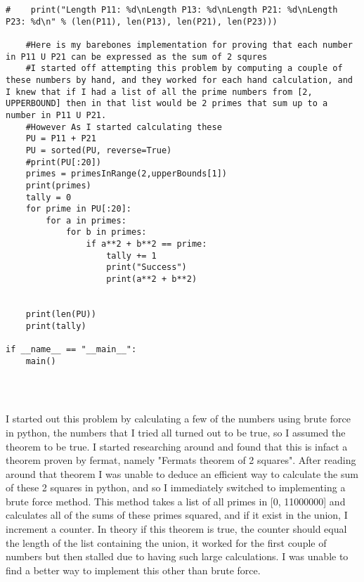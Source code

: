 \documentclass[12pt]{article}
\begin{document}
\begin{enumerate}
\begin{lstlisting}
#    print("Length P11: %d\nLength P13: %d\nLength P21: %d\nLength P23: %d\n" % (len(P11), len(P13), len(P21), len(P23)))
    
    #Here is my barebones implementation for proving that each number in P11 U P21 can be expressed as the sum of 2 squres
    #I started off attempting this problem by computing a couple of these numbers by hand, and they worked for each hand calculation, and I knew that if I had a list of all the prime numbers from [2, UPPERBOUND] then in that list would be 2 primes that sum up to a number in P11 U P21.  
    #However As I started calculating these
    PU = P11 + P21    
    PU = sorted(PU, reverse=True)
    #print(PU[:20])
    primes = primesInRange(2,upperBounds[1])
    print(primes)
    tally = 0
    for prime in PU[:20]:
        for a in primes:
            for b in primes:
                if a**2 + b**2 == prime:
                    tally += 1
                    print("Success")
                    print(a**2 + b**2)
    
    
    print(len(PU))
    print(tally)

if __name__ == "__main__":
    main()
            
            
    

    \end{lstlisting}


    \par I started out this problem by calculating a few of the numbers using brute force in python, the numbers that I tried all turned out to be true, so I assumed the theorem to be true.  I started researching around and found that this is infact a theorem proven by fermat, namely "Fermats theorem of 2 squares".  After reading around that theorem I was unable to deduce an efficient way to calculate the sum of these 2 squares in python, and so I immediately switched to implementing a brute force method.  This method takes a list of all primes in [0, 11000000] and calculates all of the sums of these primes squared, and if it exist in the union, I increment a counter.  In theory if this theorem is true, the counter should equal the length of the list containing the union, it worked for the first couple of numbers but then stalled due to having such large calculations.  I was unable to find a better way to implement this other than brute force.


\end{enumerate}
\end{document}

